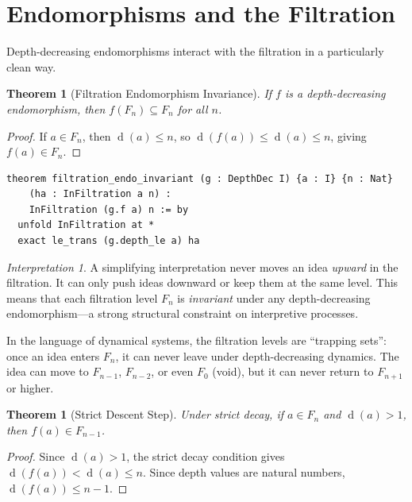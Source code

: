 \documentclass[11pt,openany]{book}
\theoremstyle{definition}
\theoremstyle{plain}
\newtheorem{theorem}[axiom]{Theorem}
\theoremstyle{remark}
\newtheorem{interpretation}[axiom]{Interpretation}
\newcommand{\depth}{\operatorname{d}}       %
\begin{document}
\section{Endomorphisms and the Filtration}

Depth-decreasing endomorphisms interact with the filtration in a particularly clean way.

\begin{theorem}[Filtration Endomorphism Invariance]
\label{thm:filtration-endo}
If $f$ is a depth-decreasing endomorphism, then $f(F_n) \subseteq F_n$ for all $n$.
\end{theorem}

\begin{proof}
If $a \in F_n$, then $\depth(a) \leq n$, so $\depth(f(a)) \leq \depth(a) \leq n$, giving $f(a) \in F_n$.
\end{proof}

\begin{lstlisting}[language=Lean4]
theorem filtration_endo_invariant (g : DepthDec I) {a : I} {n : Nat}
    (ha : InFiltration a n) :
    InFiltration (g.f a) n := by
  unfold InFiltration at *
  exact le_trans (g.depth_le a) ha
\end{lstlisting}

\begin{interpretation}
A simplifying interpretation never moves an idea \emph{upward} in the filtration. It can only push ideas downward or keep them at the same level. This means that each filtration level $F_n$ is \emph{invariant} under any depth-decreasing endomorphism---a strong structural constraint on interpretive processes.

In the language of dynamical systems, the filtration levels are ``trapping sets'': once an idea enters $F_n$, it can never leave under depth-decreasing dynamics. The idea can move to $F_{n-1}$, $F_{n-2}$, or even $F_0$ (void), but it can never return to $F_{n+1}$ or higher.
\end{interpretation}

\begin{theorem}[Strict Descent Step]
\label{thm:strict-descent-step}
Under strict decay, if $a \in F_n$ and $\depth(a) > 1$, then $f(a) \in F_{n-1}$.
\end{theorem}

\begin{proof}
Since $\depth(a) > 1$, the strict decay condition gives $\depth(f(a)) < \depth(a) \leq n$. Since depth values are natural numbers, $\depth(f(a)) \leq n - 1$.
\end{proof}
\end{document}

